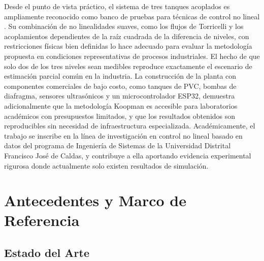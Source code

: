 \documentclass[12pt,letterpaper]{article}
\begin{document}
Desde el punto de vista práctico, el sistema de tres tanques acoplados es
ampliamente reconocido como banco de pruebas para técnicas de control no lineal
\cite{johansson2000}. Su combinación de no linealidades suaves, como los flujos de
Torricelli y los acoplamientos dependientes de la raíz cuadrada de la diferencia de
niveles, con restricciones físicas bien definidas lo hace adecuado para evaluar la
metodología propuesta en condiciones representativas de procesos industriales. El
hecho de que solo dos de los tres niveles sean medibles reproduce exactamente el
escenario de estimación parcial común en la industria. La construcción de la planta
con componentes comerciales de bajo costo, como tanques de PVC, bombas de diafragma,
sensores ultrasónicos y un microcontrolador ESP32, demuestra adicionalmente que la
metodología Koopman es accesible para laboratorios académicos con presupuestos
limitados, y que los resultados obtenidos son reproducibles sin necesidad de
infraestructura especializada. Académicamente, el trabajo se inscribe en la línea
de investigación en control no lineal basado en datos del programa de Ingeniería de
Sistemas de la Universidad Distrital Francisco José de Caldas, y contribuye a ella
aportando evidencia experimental rigurosa donde actualmente solo existen resultados
de simulación.


















\section{Antecedentes y Marco de Referencia}
\label{sec:marco}

\subsection{Estado del Arte}
\end{document}
